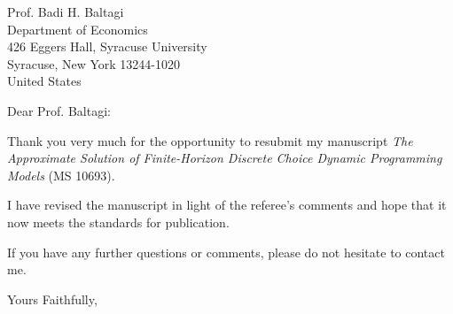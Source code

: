 \documentclass[13pt]{letter}
\begin{document}
\begin{letter}{Prof. Badi H. Baltagi \\Department of Economics \\
426 Eggers Hall, Syracuse University \\
Syracuse, New York 13244-1020\\
United States }

\opening{Dear Prof. Baltagi:}

Thank you very much for the opportunity to resubmit my manuscript \textit{The Approximate Solution of Finite-Horizon Discrete Choice Dynamic Programming Models} (MS 10693).

I have revised the manuscript in light of the referee's comments and hope that it now meets the standards for publication.

If you have any further questions or comments, please do not hesitate to contact me.\newline

\closing{Yours Faithfully,}\vspace{0.5cm}

\end{letter}
\end{document}
